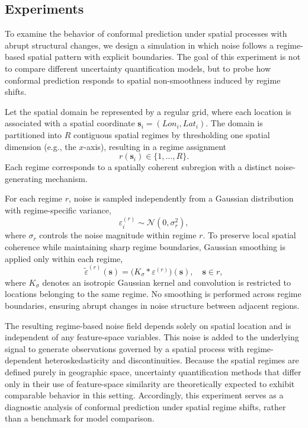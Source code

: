 \documentclass[authoryear,preprint,review,12pt]{elsarticle}
\begin{document}
{
\color{red}

\subsection{Experiments} 

To examine the behavior of conformal prediction under spatial processes with abrupt structural changes, we design a simulation in which noise follows a regime-based spatial pattern with explicit boundaries. The goal of this experiment is not to compare different uncertainty quantification models, but to probe how conformal prediction responds to spatial non-smoothness induced by regime shifts.

Let the spatial domain be represented by a regular grid, where each location is associated with a spatial coordinate $\mathbf{s}_i = (Lon_i, Lat_i)$. The domain is partitioned into $R$ contiguous spatial regimes by thresholding one spatial dimension (e.g., the $x$-axis), resulting in a regime assignment
\begin{equation}
r(\mathbf{s}_i) \in \{1, \dots, R\}.
\end{equation}
Each regime corresponds to a spatially coherent subregion with a distinct noise-generating mechanism.

For each regime $r$, noise is sampled independently from a Gaussian distribution with regime-specific variance,
\begin{equation}
\varepsilon_i^{(r)} \sim \mathcal{N}(0, \sigma_r^2),
\end{equation}
where $\sigma_r$ controls the noise magnitude within regime $r$. To preserve local spatial coherence while maintaining sharp regime boundaries, Gaussian smoothing is applied only within each regime,
\begin{equation}
\tilde{\varepsilon}^{(r)}(\mathbf{s}) = \big(K_\sigma * \varepsilon^{(r)}\big)(\mathbf{s}), \quad \mathbf{s} \in r,
\end{equation}
where $K_\sigma$ denotes an isotropic Gaussian kernel and convolution is restricted to locations belonging to the same regime. No smoothing is performed across regime boundaries, ensuring abrupt changes in noise structure between adjacent regions.

The resulting regime-based noise field depends solely on spatial location and is independent of any feature-space variables. This noise is added to the underlying signal to generate observations governed by a spatial process with regime-dependent heteroskedasticity and discontinuities. Because the spatial regimes are defined purely in geographic space, uncertainty quantification methods that differ only in their use of feature-space similarity are theoretically expected to exhibit comparable behavior in this setting. Accordingly, this experiment serves as a diagnostic analysis of conformal prediction under spatial regime shifts, rather than a benchmark for model comparison.

}
\end{document}
